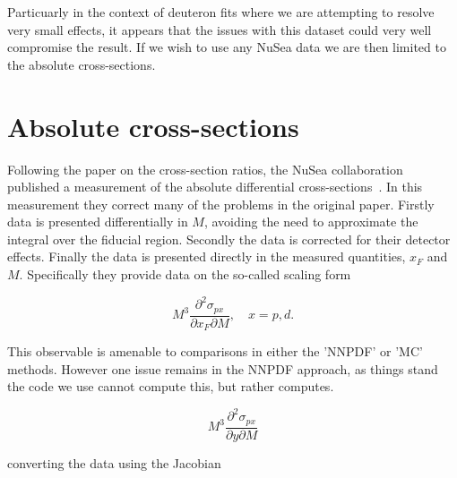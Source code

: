 \documentclass[11pt]{article}
\newcommand{\be}{\begin{equation}}
\newcommand{\ee}{\end{equation}}
\begin{document}
Particuarly in the context of deuteron fits where we are attempting to resolve very small effects, it appears that the
issues with this dataset could very well compromise the result. If we wish to use any NuSea data we are then limited to the absolute cross-sections.

\section{Absolute cross-sections}
Following the paper on the cross-section ratios, the NuSea collaboration published a measurement of the absolute differential cross-sections~\cite{Webb:2003ps}.
In this measurement they correct many of the problems in the original paper. Firstly data is presented differentially in $M$, avoiding the need to approximate
the integral over the fiducial region. Secondly the data is corrected for their detector effects. Finally the data is presented directly in the measured quantities,
$x_F$ and $M$. Specifically they provide data on the so-called scaling form

\be M^3 \frac{\partial^2 \sigma_{px}}{\partial x_F \partial M}, \quad x = p,d.\ee

This observable is amenable to comparisons in either the 'NNPDF' or 'MC' methods. However one issue remains in the NNPDF approach, as things stand the code
we use cannot compute this, but rather computes.

\be M^3 \frac{\partial^2 \sigma_{px}}{\partial y \partial M} \ee

converting the data using the Jacobian
\end{document}

